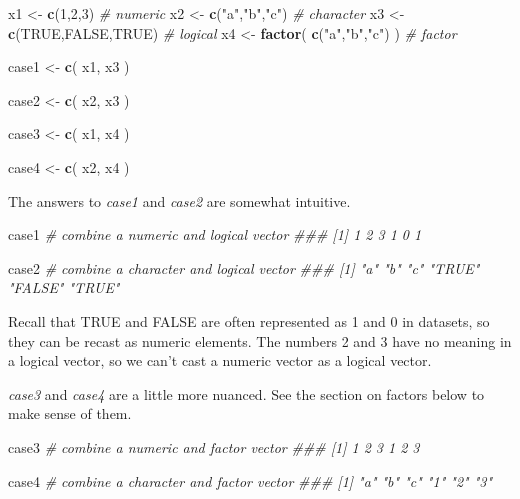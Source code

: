 \documentclass[]{book}
\newenvironment{Shaded}{\begin{snugshade}}{\end{snugshade}}
\newcommand{\CommentTok}[1]{\textcolor[rgb]{0.56,0.35,0.01}{\textit{#1}}}
\newcommand{\DecValTok}[1]{\textcolor[rgb]{0.00,0.00,0.81}{#1}}
\newcommand{\KeywordTok}[1]{\textcolor[rgb]{0.13,0.29,0.53}{\textbf{#1}}}
\newcommand{\NormalTok}[1]{#1}
\newcommand{\OtherTok}[1]{\textcolor[rgb]{0.56,0.35,0.01}{#1}}
\newcommand{\StringTok}[1]{\textcolor[rgb]{0.31,0.60,0.02}{#1}}
\theoremstyle{definition}
\theoremstyle{definition}
\theoremstyle{definition}
\theoremstyle{remark}
\begin{document}
\begin{Shaded}
\begin{Highlighting}[]

\NormalTok{x1 <-}\StringTok{ }\KeywordTok{c}\NormalTok{(}\DecValTok{1}\NormalTok{,}\DecValTok{2}\NormalTok{,}\DecValTok{3}\NormalTok{)                    }\CommentTok{# numeric}
\NormalTok{x2 <-}\StringTok{ }\KeywordTok{c}\NormalTok{(}\StringTok{"a"}\NormalTok{,}\StringTok{"b"}\NormalTok{,}\StringTok{"c"}\NormalTok{)              }\CommentTok{# character}
\NormalTok{x3 <-}\StringTok{ }\KeywordTok{c}\NormalTok{(}\OtherTok{TRUE}\NormalTok{,}\OtherTok{FALSE}\NormalTok{,}\OtherTok{TRUE}\NormalTok{)          }\CommentTok{# logical}
\NormalTok{x4 <-}\StringTok{ }\KeywordTok{factor}\NormalTok{( }\KeywordTok{c}\NormalTok{(}\StringTok{"a"}\NormalTok{,}\StringTok{"b"}\NormalTok{,}\StringTok{"c"}\NormalTok{) )    }\CommentTok{# factor}

\NormalTok{case1 <-}\StringTok{ }\KeywordTok{c}\NormalTok{( x1, x3 )}

\NormalTok{case2 <-}\StringTok{ }\KeywordTok{c}\NormalTok{( x2, x3 )}

\NormalTok{case3 <-}\StringTok{ }\KeywordTok{c}\NormalTok{( x1, x4 )}

\NormalTok{case4 <-}\StringTok{ }\KeywordTok{c}\NormalTok{( x2, x4 )}
\end{Highlighting}
\end{Shaded}

The answers to \emph{case1} and \emph{case2} are somewhat intuitive.

\begin{Shaded}
\begin{Highlighting}[]
\NormalTok{case1  }\CommentTok{# combine a numeric and logical vector}
\CommentTok{### [1] 1 2 3 1 0 1}

\NormalTok{case2  }\CommentTok{# combine a character and logical vector}
\CommentTok{### [1] "a"     "b"     "c"     "TRUE"  "FALSE" "TRUE"}
\end{Highlighting}
\end{Shaded}

Recall that TRUE and FALSE are often represented as 1 and 0 in datasets,
so they can be recast as numeric elements. The numbers 2 and 3 have no
meaning in a logical vector, so we can't cast a numeric vector as a
logical vector.

\emph{case3} and \emph{case4} are a little more nuanced. See the section
on factors below to make sense of them.

\begin{Shaded}
\begin{Highlighting}[]
\NormalTok{case3  }\CommentTok{# combine a numeric and factor vector}
\CommentTok{### [1] 1 2 3 1 2 3}

\NormalTok{case4  }\CommentTok{# combine a character and factor vector}
\CommentTok{### [1] "a" "b" "c" "1" "2" "3"}
\end{Highlighting}
\end{Shaded}
\end{document}
